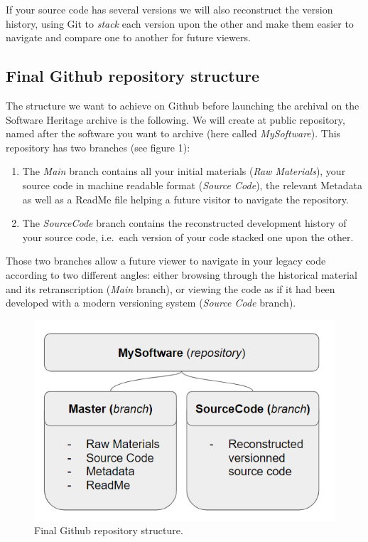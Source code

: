 \documentclass[]{article}
\providecommand{\tightlist}{%
  \setlength{\itemsep}{0pt}\setlength{\parskip}{0pt}}
\begin{document}
If your source code has several versions we will also reconstruct the
version history, using Git to \emph{stack} each version upon the other
and make them easier to navigate and compare one to another for future
viewers.

\hypertarget{final-github-repository-structure}{%
\subsection{Final Github repository
structure}\label{final-github-repository-structure}}

The structure we want to achieve on Github before launching the archival
on the Software Heritage archive is the following. We will create at
public repository, named after the software you want to archive (here
called \emph{MySoftware}). This repository has two branches (see figure
1):

\begin{enumerate}
\def\labelenumi{\arabic{enumi})}
\tightlist
\item
  The \emph{Main} branch contains all your initial materials (\emph{Raw
  Materials}), your source code in machine readable format (\emph{Source
  Code}), the relevant Metadata as well as a ReadMe file helping a
  future visitor to navigate the repository.
\item
  The \emph{SourceCode} branch contains the reconstructed development
  history of your source code, i.e.~each version of your code stacked
  one upon the other.
\end{enumerate}

Those two branches allow a future viewer to navigate in your legacy code
according to two different angles: either browsing through the
historical material and its retranscription (\emph{Main} branch), or
viewing the code as if it had been developed with a modern versioning
system (\emph{Source Code} branch).

\begin{figure}
\hypertarget{fig:repoStructure}{%
\centering
\includegraphics{./media2/01_RepoStructure.png}
\caption{Final Github repository structure.}\label{fig:repoStructure}
}
\end{figure}
\end{document}
